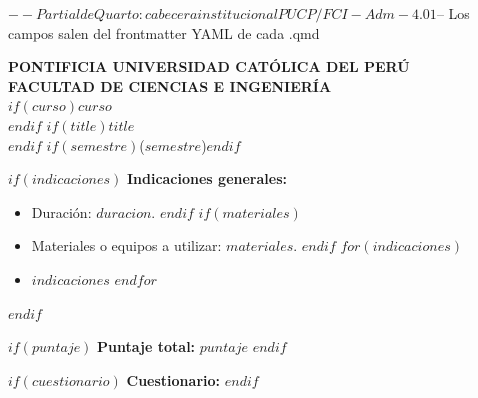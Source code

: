 $-- Partial de Quarto: cabecera institucional PUCP / FCI-Adm-4.01
$-- Los campos salen del frontmatter YAML de cada .qmd
\thispagestyle{fciprimera}

\begin{center}
{\bfseries PONTIFICIA UNIVERSIDAD CAT\'OLICA DEL PER\'U}\\
{\bfseries FACULTAD DE CIENCIAS E INGENIER\'IA}\\[1.4em]
$if(curso)${\bfseries $curso$}\\[0.3em]$endif$
$if(title)${\large $title$}\\[0.3em]$endif$
$if(semestre)$($semestre$)$endif$
\end{center}

\vspace{1.2em}

$if(indicaciones)$
\noindent\textbf{Indicaciones generales:}
\begin{itemize}[leftmargin=1.6em, itemsep=0.15em, topsep=0.3em]
$if(duracion)$
\item Duraci\'on: $duracion$.
$endif$
$if(materiales)$
\item Materiales o equipos a utilizar: $materiales$.
$endif$
$for(indicaciones)$
\item $indicaciones$
$endfor$
\end{itemize}
$endif$

$if(puntaje)$
\vspace{0.6em}
\noindent\textbf{Puntaje total:} $puntaje$
$endif$

$if(cuestionario)$
\vspace{0.8em}
\noindent\textbf{Cuestionario:}
$endif$

\vspace{0.4em}
